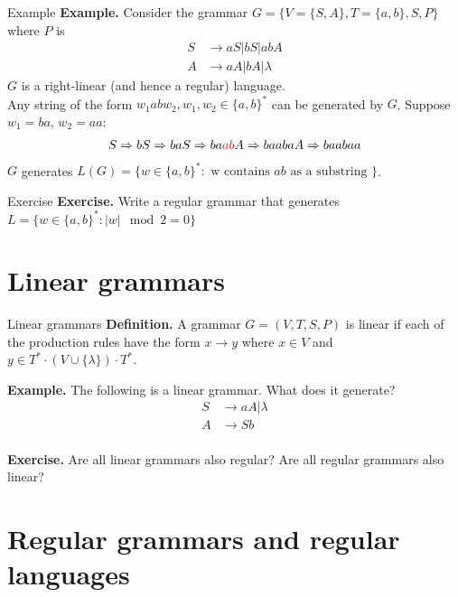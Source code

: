 \documentclass[10pt]{beamer}
\begin{document}
\begin{frame}{Example}
    \textbf{Example.} Consider the grammar $G = \{V = \{S,A\}, T = \{a,b\}, S, P\}$ where $P$ is
    \begin{align*}
        S & \rightarrow aS|bS|abA     \\
        A & \rightarrow aA|bA|\lambda
    \end{align*}
    $G$ is a right-linear (and hence a regular) language.\\\bigskip
    Any string of the form $w_1abw_2, w_1,w_2 \in \{a,b\}^*$ can be generated by $G$. Suppose $w_1 = ba$, $w_2 = aa$:
    \begin{align*}
        S \Rightarrow bS \Rightarrow  baS \Rightarrow ba\textcolor{red}{ab}A \Rightarrow baabaA \Rightarrow baabaa
    \end{align*}
    $G$ generates $L(G) = \{w \in \{a,b\}^*: \text{ w contains $ab$ as a substring }\}$.
\end{frame}

\begin{frame}[t]{Exercise}
    \textbf{Exercise.} Write a regular grammar that generates $L = \{w \in \{a,b\}^*: |w| \mod 2 = 0\}$
\end{frame}

\section{Linear grammars}

\begin{frame}{Linear grammars}
    \textbf{Definition.} A grammar $G = (V,T,S,P)$ is linear if each of the production rules have the form $x \rightarrow y$ where $x \in V$ and $y \in T^* \cdot (V \cup \{\lambda\}) \cdot T^*$.

    \textbf{Example.} The following is a linear grammar. What does it generate?
    \begin{align*}
        S & \rightarrow aA | \lambda \\
        A & \rightarrow Sb           \\
    \end{align*}

    \textbf{Exercise.} Are all linear grammars also regular? Are all regular grammars also linear?
\end{frame}

\section{Regular grammars and regular languages}
\end{document}
